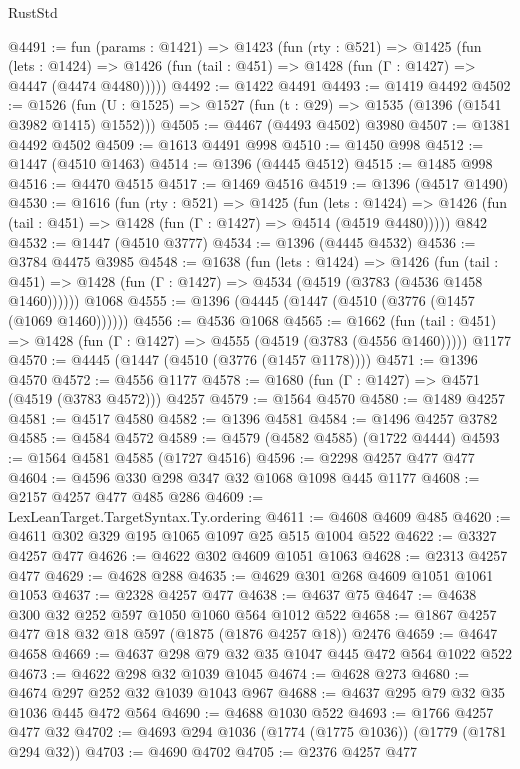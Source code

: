 \begin{lexlean}{RustStd}
\begin{coremodule}
@4491 := fun (params : @1421) =>
  @1423
    (fun (rty : @521) =>
    @1425
      (fun (lets : @1424) =>
      @1426 (fun (tail : @451) => @1428 (fun (Γ : @1427) => @4447 (@4474 @4480)))))
@4492 := @1422 @4491
@4493 := @1419 @4492
@4502 := @1526 (fun (U : @1525) => @1527 (fun (t : @29) => @1535 (@1396 (@1541 @3982 @1415) @1552)))
@4505 := @4467 (@4493 @4502) @3980
@4507 := @1381 @4492 @4502
@4509 := @1613 @4491 @998
@4510 := @1450 @998
@4512 := @1447 (@4510 @1463)
@4514 := @1396 (@4445 @4512)
@4515 := @1485 @998
@4516 := @4470 @4515
@4517 := @1469 @4516
@4519 := @1396 (@4517 @1490)
@4530 := @1616
    (fun (rty : @521) =>
    @1425
      (fun (lets : @1424) =>
      @1426 (fun (tail : @451) => @1428 (fun (Γ : @1427) => @4514 (@4519 @4480)))))
    @842
@4532 := @1447 (@4510 @3777)
@4534 := @1396 (@4445 @4532)
@4536 := @3784 @4475 @3985
@4548 := @1638
    (fun (lets : @1424) =>
    @1426
      (fun (tail : @451) => @1428 (fun (Γ : @1427) => @4534 (@4519 (@3783 (@4536 @1458 @1460))))))
    @1068
@4555 := @1396 (@4445 (@1447 (@4510 (@3776 (@1457 (@1069 @1460))))))
@4556 := @4536 @1068
@4565 := @1662
    (fun (tail : @451) => @1428 (fun (Γ : @1427) => @4555 (@4519 (@3783 (@4556 @1460)))))
    @1177
@4570 := @4445 (@1447 (@4510 (@3776 (@1457 @1178))))
@4571 := @1396 @4570
@4572 := @4556 @1177
@4578 := @1680 (fun (Γ : @1427) => @4571 (@4519 (@3783 @4572))) @4257
@4579 := @1564 @4570
@4580 := @1489 @4257
@4581 := @4517 @4580
@4582 := @1396 @4581
@4584 := @1496 @4257 @3782
@4585 := @4584 @4572
@4589 := @4579 (@4582 @4585) (@1722 @4444)
@4593 := @1564 @4581 @4585 (@1727 @4516)
@4596 := @2298 @4257 @477 @477
@4604 := @4596 @330 @298 @347 @32 @1068 @1098 @445 @1177
@4608 := @2157 @4257 @477 @485 @286
@4609 := LexLeanTarget.TargetSyntax.Ty.ordering
@4611 := @4608 @4609 @485
@4620 := @4611 @302 @329 @195 @1065 @1097 @25 @515 @1004 @522
@4622 := @3327 @4257 @477
@4626 := @4622 @302 @4609 @1051 @1063
@4628 := @2313 @4257 @477
@4629 := @4628 @288
@4635 := @4629 @301 @268 @4609 @1051 @1061 @1053
@4637 := @2328 @4257 @477
@4638 := @4637 @75
@4647 := @4638 @300 @32 @252 @597 @1050 @1060 @564 @1012 @522
@4658 := @1867 @4257 @477 @18 @32 @18 @597 (@1875 (@1876 @4257 @18)) @2476
@4659 := @4647 @4658
@4669 := @4637 @298 @79 @32 @35 @1047 @445 @472 @564 @1022 @522
@4673 := @4622 @298 @32 @1039 @1045
@4674 := @4628 @273
@4680 := @4674 @297 @252 @32 @1039 @1043 @967
@4688 := @4637 @295 @79 @32 @35 @1036 @445 @472 @564
@4690 := @4688 @1030 @522
@4693 := @1766 @4257 @477 @32
@4702 := @4693 @294 @1036 (@1774 (@1775 @1036)) (@1779 (@1781 @294 @32))
@4703 := @4690 @4702
@4705 := @2376 @4257 @477

\end{coremodule}
\end{lexlean}
